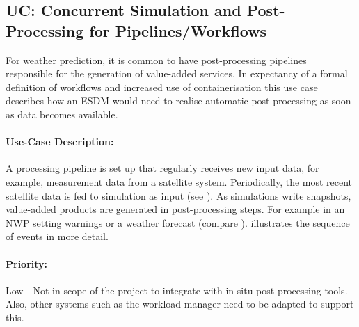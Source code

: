 %
%
%
%
%
%



\subsection{UC: Concurrent Simulation and Post-Processing for Pipelines/Workflows}
\label{uc: pipeline}

For weather prediction, it is common to have post-processing pipelines responsible for the generation of value-added services.
In expectancy of a formal definition of workflows and increased use of containerisation this use case describes how an ESDM would need to realise automatic post-processing as soon as data becomes available.


\paragraph{Use-Case Description:}
A processing pipeline is set up that regularly receives new input data, for example, measurement data from a satellite system.
Periodically, the most recent satellite data is fed to simulation as input (see ).
As simulations write snapshots, value-added products are generated in post-processing steps.
For example in an NWP setting warnings or a weather forecast (compare ).
 illustrates the sequence of events in more detail.




\paragraph{Priority:}
Low - Not in scope of the project to integrate with in-situ post-processing tools.
Also, other systems such as the workload manager need to be adapted to support this.


